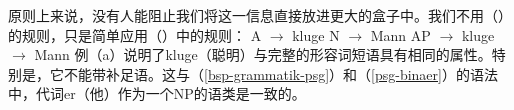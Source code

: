 原则上来说，没有人能阻止我们将这一信息直接放进更大的盒子中。我们不用（）的规则，只是简单应用（）中的规则：
\eal
\ex A $\to$ kluge
\ex N $\to$ Mann
\zl
\eal
\label{Lexikon-Projektion}
\ex AP $\to$ kluge
\ex \nbar $\to$ Mann
\zl
例（a）说明了kluge（聪明）与完整的形容词短语具有相同的属性。特别是，它不能带补足语。这与（\ref{bsp-grammatik-psg}）和（\ref{psg-binaer}）的语法中，代词er（他）作为一个NP的语类是一致的。

